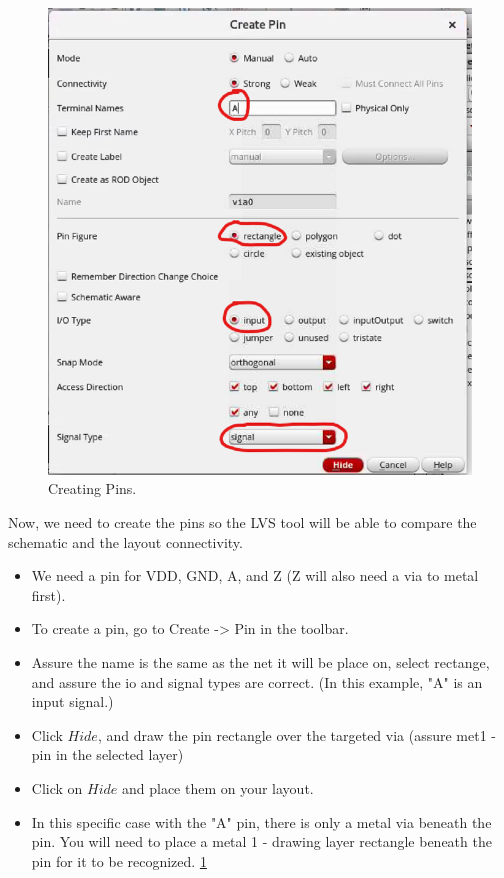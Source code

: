 \parbox[t]{\dimexpr\textwidth-\leftmargin}{%
	\begin{figure}
		\vspace{-0mm}
		\centering
		\vspace{-\baselineskip}
		\includegraphics[scale=0.33]{figures/lab2/9}
		\caption{Creating Pins.}
		\label{pins}
	\end{figure}
	Now, we need to create the pins so the LVS tool will be able to compare the schematic and the layout connectivity.
	\begin{itemize}
		\item We need a pin for VDD, GND, A, and Z (Z will also need a via to metal first).
		\item To create a pin, go to Create -> Pin in the toolbar.
		\item Assure the name is the same as the net it will be place on, select rectange, and assure the io and signal types are correct. (In this example, "A" is an input signal.)
		\item Click $Hide$, and draw the pin rectangle over the targeted via (assure met1 - pin in the selected layer)
		\item Click on $Hide$ and place them on your layout.
		\item In this specific case with the "A" pin, there is only a metal via beneath the pin. You will need to place a metal 1 - drawing layer rectangle beneath the pin for it to be recognized. \ref{pins}\end{itemize}
}

